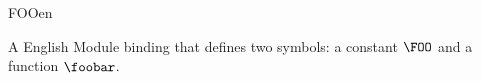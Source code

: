\begin{mhmodnl}{FOO}{en}
  \begin{definition}
    A English Module binding that defines two symbols: a constant $\FOO$ and a function
    $\foobar$.
  \end{definition}
\end{mhmodnl}

